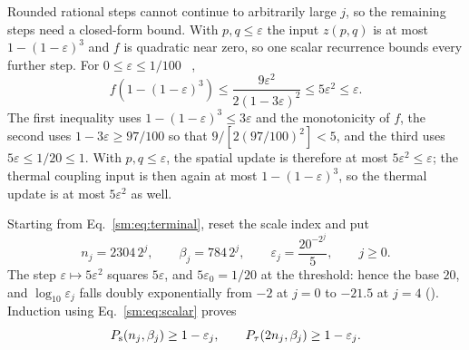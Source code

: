 Rounded rational steps cannot continue to arbitrarily large $j$, so the
remaining steps need a closed-form bound. With $p,q\le\varepsilon$ the
input $z(p,q)$ is at most $1-(1-\varepsilon)^3$ and $f$ is quadratic
near zero, so one scalar recurrence bounds every further step.
For $0\le\varepsilon\le1/100$%
~,
\begin{equation}
    f(1-(1-\varepsilon)^3)
    \le\frac{9\varepsilon^2}{2(1-3\varepsilon)^2}
    \le5\varepsilon^2\le\varepsilon.
    \label{sm:eq:scalar}
\end{equation}
The first inequality uses $1-(1-\varepsilon)^3\le3\varepsilon$ and the
monotonicity of $f$, the second uses $1-3\varepsilon\ge97/100$ so that
$9/[2(97/100)^2]<5$, and the third uses $5\varepsilon\le1/20\le1$.
With $p,q\le\varepsilon$, the spatial update is
therefore at most $5\varepsilon^2\le\varepsilon$; the thermal coupling
input is then again at most $1-(1-\varepsilon)^3$, so the thermal
update is at most $5\varepsilon^2$ as well.

Starting from Eq.~\eqref{sm:eq:terminal}, reset the scale index and put
\begin{equation}
    n_j=2304\,2^j,\qquad
    \beta_j=784\,2^j,\qquad
    \varepsilon_j=\frac{20^{-2^j}}5,\qquad j\ge0.
    \label{sm:eq:tail-scales}
\end{equation}
The step $\varepsilon\mapsto5\varepsilon^2$ squares $5\varepsilon$, and
$5\varepsilon_0=1/20$ at the threshold: hence the base $20$, and
$\log_{10}\varepsilon_j$ falls doubly exponentially from $-2$ at $j=0$
to $-21.5$ at $j=4$ ().
Induction using Eq.~\eqref{sm:eq:scalar} proves%
~
\begin{equation}
    P_{\mathrm s}(n_j,\beta_j)\ge1-\varepsilon_j,\qquad
    P_{\tau}(2n_j,\beta_j)\ge1-\varepsilon_j.
    \label{sm:eq:tail}
\end{equation}


